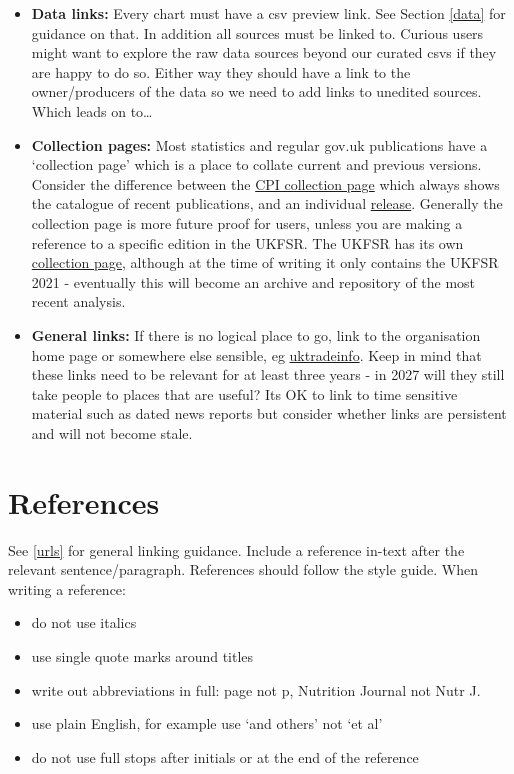 \documentclass[
]{book}
\providecommand{\tightlist}{%
  \setlength{\itemsep}{0pt}\setlength{\parskip}{0pt}}
\begin{document}
\begin{itemize}
\item
  \textbf{Data links:} Every chart must have a csv preview link. See Section \ref{data} for
  guidance on that. In addition all sources must be linked to. Curious users might
  want to explore the raw data sources beyond our curated csvs if they are happy
  to do so. Either way they should have a link to the owner/producers of the data
  so we need to add links to unedited sources. Which leads on to\ldots{}
\item
  \textbf{Collection pages:} Most statistics and regular gov.uk publications have a `collection page' which is a place to collate current and previous versions. Consider the difference between the \href{https://www.ons.gov.uk/economy/inflationandpriceindices/bulletins/consumerpriceinflation/previousReleases}{CPI collection page} which always shows the catalogue of recent publications, and an individual \href{https://www.ons.gov.uk/economy/inflationandpriceindices/bulletins/consumerpriceinflation/september2023}{release}. Generally the collection page is more future proof for users, unless you are making a reference to a specific edition in the UKFSR. The UKFSR has its own \href{https://www.gov.uk/government/collections/united-kingdom-food-security-report}{collection page}, although at the time of writing it only contains the UKFSR 2021 - eventually this will become an archive and repository of the most recent analysis.
\item
  \textbf{General links:} If there is no logical place to go, link to the organisation home page or somewhere else sensible, eg \href{https://www.uktradeinfo.com/trade-data/ots-custom-table/}{uktradeinfo}. Keep in mind that these links need to be relevant for at least three years - in 2027 will they still take people to places that are useful? Its OK to link to time sensitive material such as dated news reports but consider whether links are persistent and will not become stale.
\end{itemize}

\hypertarget{refs}{%
\section{References}\label{refs}}

See \ref{urls} for general linking guidance. Include a reference in-text after
the relevant sentence/paragraph. References should follow the style guide. When
writing a reference:

\begin{itemize}
\tightlist
\item
  do not use italics
\item
  use single quote marks around titles
\item
  write out abbreviations in full: page not p, Nutrition Journal not Nutr J.
\item
  use plain English, for example use `and others' not `et al'
\item
  do not use full stops after initials or at the end of the reference
\end{itemize}
\end{document}
